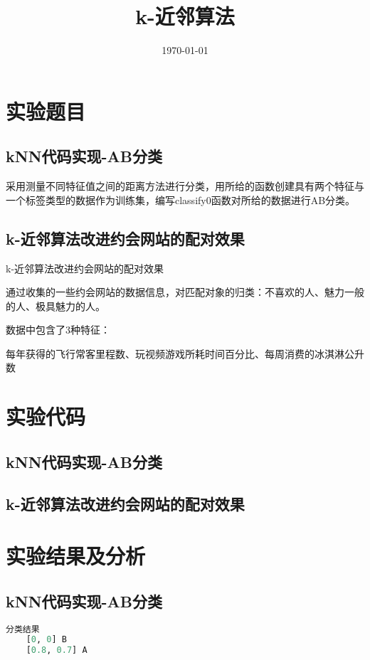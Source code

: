 \documentclass{../source/Experiment}
\title{k-近邻算法}
\date{\today}
\begin{document}
    \makecover
    \section{实验题目}
        \subsection{kNN代码实现-AB分类}
        采用测量不同特征值之间的距离方法进行分类，用所给的函数创建具有两个特征与一个标签类型的数据作为训练集，编写classify0函数对所给的数据进行AB分类。
        \subsection{k-近邻算法改进约会网站的配对效果}
    k-近邻算法改进约会网站的配对效果

    通过收集的一些约会网站的数据信息，对匹配对象的归类：不喜欢的人、魅力一般的人、极具魅力的人。

    数据中包含了3种特征：

    每年获得的飞行常客里程数、玩视频游戏所耗时间百分比、每周消费的冰淇淋公升数
    
    \section{实验代码}
    \subsection{kNN代码实现-AB分类}
    

    \subsection{k-近邻算法改进约会网站的配对效果}
    
    \section{实验结果及分析}
    \subsection{kNN代码实现-AB分类}
    \begin{lstlisting}[language=Python]
    分类结果
    [0, 0] B
    [0.8, 0.7] A
    \end{lstlisting}
\end{document}
